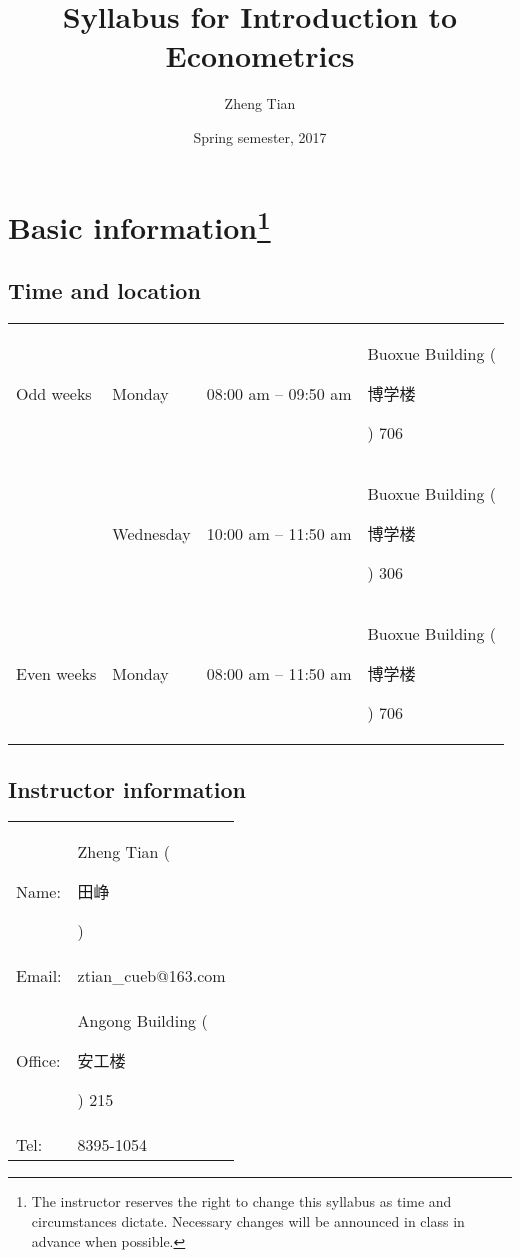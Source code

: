 \documentclass[a4paper,11pt]{article}
\author{Zheng Tian}
\date{Spring semester, 2017}
\title{Syllabus for Introduction to Econometrics}
\begin{document}
\maketitle

\section{Basic information\footnote{The instructor reserves the right to change this syllabus as
time and circumstances dictate. Necessary changes will be announced in
class in advance when possible.}}
\label{sec:orgc4c42a8}
\subsection*{Time and location}
\label{sec:org49faddd}

\begin{center}
\begin{tabular}{llll}
Odd weeks & Monday & 08:00 am -- 09:50 am & Buoxue Building (\begin{CJK*}{UTF8}{gbsn}博学楼\end{CJK*}) 706\\
 & Wednesday & 10:00 am -- 11:50 am & Buoxue Building (\begin{CJK*}{UTF8}{gbsn}博学楼\end{CJK*}) 306\\
Even weeks & Monday & 08:00 am -- 11:50 am & Buoxue Building (\begin{CJK*}{UTF8}{gbsn}博学楼\end{CJK*}) 706\\
\end{tabular}
\end{center}


\subsection*{Instructor information}
\label{sec:orga1b60cd}

\begin{center}
\begin{tabular}{ll}
Name: & Zheng Tian (\begin{CJK*}{UTF8}{gbsn}田峥\end{CJK*})\\
Email: & ztian\_cueb@163.com\\
Office: & Angong Building (\begin{CJK*}{UTF8}{gbsn}安工楼\end{CJK*}) 215\\
Tel: & 8395-1054\\
\end{tabular}
\end{center}
\end{document}
